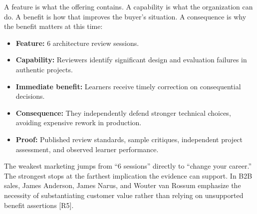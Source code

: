 A feature is what the offering contains. A capability is what the organization can do. A benefit is how that improves the buyer's situation. A consequence is why the benefit matters at this time:

\begin{itemize}
    \item \textbf{Feature:} 6 architecture review sessions.
    \item \textbf{Capability:} Reviewers identify significant design and evaluation failures in authentic projects.
    \item \textbf{Immediate benefit:} Learners receive timely correction on consequential decisions.
    \item \textbf{Consequence:} They independently defend stronger technical choices, avoiding expensive rework in production.
    \item \textbf{Proof:} Published review standards, sample critiques, independent project assessment, and observed learner performance.
\end{itemize}

The weakest marketing jumps from ``6 sessions'' directly to ``change your career.'' The strongest stops at the farthest implication the evidence can support. In B2B sales, James Anderson, James Narus, and Wouter van Rossum emphasize the necessity of substantiating customer value rather than relying on unsupported benefit assertions [R5].
